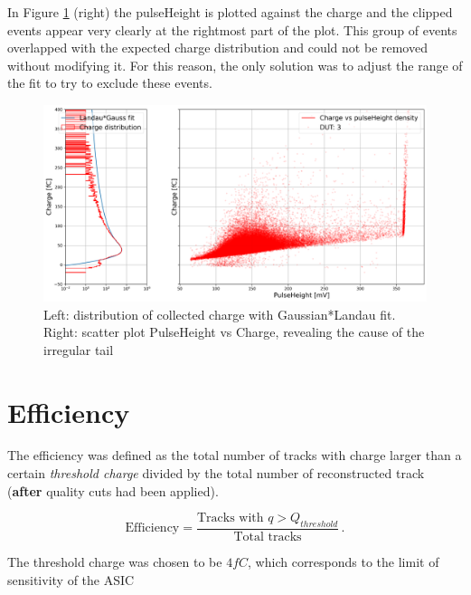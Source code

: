 In Figure \ref{fig:charge_vs_pulseHeight_for_clipping} (right) the pulseHeight is plotted against the charge and the clipped events appear very clearly at the rightmost part of the plot. This group of events overlapped with the expected charge distribution and could not be removed without modifying it. For this reason, the only solution was to adjust the range of the fit to try to exclude these events.

\begin{figure}
    \centering
    \includegraphics[width=1\linewidth]{Images/charge_plots/Charge_vs_pulseHeight_density_413_S2_dut3.png}
    \caption{Left: distribution of collected charge with Gaussian*Landau fit. Right: scatter plot PulseHeight vs Charge, revealing the cause of the irregular tail}
    \label{fig:charge_vs_pulseHeight_for_clipping}
\end{figure}



\section{Efficiency}\label{sec:efficiency}

The efficiency was defined as the total number of tracks with charge larger than a certain \textit{threshold charge} divided by the total number of reconstructed track (\textbf{after} quality cuts had been applied).

\begin{equation*}
    \text{Efficiency} = \frac{\text{Tracks with } q>Q_{threshold}}{\text{Total tracks}}  \, .
\end{equation*}

The threshold charge was chosen to be \(4\si{fC}\), which corresponds to the limit of sensitivity of the ASIC  


